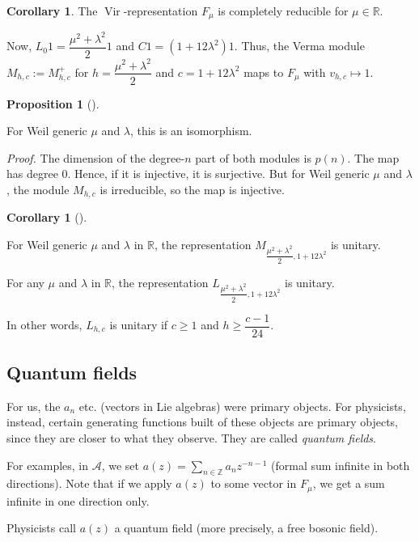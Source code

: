 \documentclass
[numbers=enddot,12pt,final,onecolumn,german,notitlepage]{scrartcl}%
\theoremstyle{definition}
\newtheorem{prop}[theo]{Proposition}
\newenvironment{proposition}[1][]
{\begin{prop}[#1]\begin{leftbar}}
{\end{leftbar}\end{prop}}
\newtheorem{coro}[theo]{Corollary}
\newenvironment{corollary}[1][]
{\begin{coro}[#1]\begin{leftbar}}
{\end{leftbar}\end{coro}}
\begin{document}
\begin{coro}
The $\operatorname*{Vir}$-representation $F_{\mu}$ is completely reducible for
$\mu\in\mathbb{R}$.
\end{coro}

Now, $L_{0}1=\dfrac{\mu^{2}+\lambda^{2}}{2}1$ and $C1=\left(  1+12\lambda
^{2}\right)  1$. Thus, the Verma module $M_{h,c}:=M_{h,c}^{+}$ for
$h=\dfrac{\mu^{2}+\lambda^{2}}{2}$ and $c=1+12\lambda^{2}$ maps to $F_{\mu}$
with $v_{h,c}\mapsto1$.

\begin{proposition}
For Weil generic $\mu$ and $\lambda$, this is an isomorphism.
\end{proposition}

\textit{Proof.} The dimension of the degree-$n$ part of both modules is
$p\left(  n\right)  $. The map has degree $0$. Hence, if it is injective, it
is surjective. But for Weil generic $\mu$ and $\lambda$, the module $M_{h,c}$
is irreducible, so the map is injective.

\begin{corollary}
For Weil generic $\mu$ and $\lambda$ in $\mathbb{R}$, the representation
$M_{\dfrac{\mu^{2}+\lambda^{2}}{2},1+12\lambda^{2}}$ is unitary.

For any $\mu$ and $\lambda$ in $\mathbb{R}$, the representation $L_{\dfrac
{\mu^{2}+\lambda^{2}}{2},1+12\lambda^{2}}$ is unitary.

In other words, $L_{h,c}$ is unitary if $c\geq1$ and $h\geq\dfrac{c-1}{24}$.
\end{corollary}

\subsection{Quantum fields}

For us, the $a_{n}$ etc. (vectors in Lie algebras) were primary objects. For
physicists, instead, certain generating functions built of these objects are
primary objects, since they are closer to what they observe. They are called
\textit{quantum fields}.

For examples, in $\mathcal{A}$, we set $a\left(  z\right)  =\sum
\limits_{n\in\mathbb{Z}}a_{n}z^{-n-1}$ (formal sum infinite in both
directions). Note that if we apply $a\left(  z\right)  $ to some vector in
$F_{\mu}$, we get a sum infinite in one direction only.

Physicists call $a\left(  z\right)  $ a quantum field (more precisely, a free
bosonic field).
\end{document}
